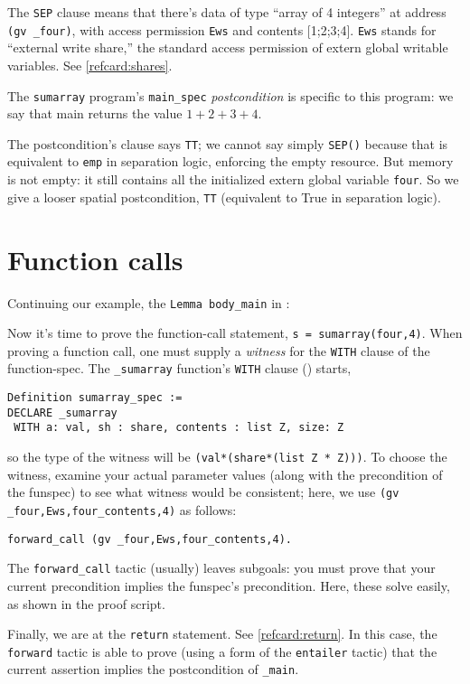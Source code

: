 \documentclass[12pt,fleqn,openany,oneside,showtrims]{memoir}
\begin{document}
The \lstinline{SEP} clause means that there's
data of type ``array of 4 integers'' at
address \lstinline{(gv _four)}, with access permission
\lstinline{Ews} and contents [1;2;3;4].
\lstinline{Ews} stands for ``external write share,''
the standard access permission of extern global writable
variables.  See \autoref{refcard:shares}.

The \lstinline{sumarray} program's \lstinline{main_spec}
\emph{postcondition} is specific to this program:
we say that main returns the value $1+2+3+4$.

The postcondition's \SEP{} clause says \lstinline{TT}; we cannot say simply
\lstinline{SEP()} because that is equivalent to
\lstinline{emp} in separation logic,
enforcing the empty resource.  But memory is not empty:
it still contains all the initialized extern global variable
\lstinline{four}.  So we give a looser spatial postcondition,
\lstinline{TT} (equivalent to True in separation logic).


\chapter{Function calls}
\label{refcard:forward-call}
Continuing our example, the \lstinline{Lemma body_main}
in :

Now it's time to prove the function-call statement,
\lstinline{s = sumarray(four,4)}.
When proving a function call, one must supply
a \emph{witness} for the \lstinline{WITH} clause
of the function-spec.  The \lstinline{_sumarray}
function's \lstinline{WITH} clause ()
starts,
\begin{lstlisting}
Definition sumarray_spec :=
DECLARE _sumarray
 WITH a: val, sh : share, contents : list Z, size: Z
\end{lstlisting}
so the type of the witness will be
\lstinline{(val*(share*(list Z * Z)))}.
To choose the witness, examine your actual parameter values
(along with the precondition of the funspec) to see
what witness would be consistent; here, we use
\lstinline{(gv _four,Ews,four_contents,4)} as follows:
\begin{lstlisting}
forward_call (gv _four,Ews,four_contents,4).
\end{lstlisting}
The \lstinline{forward_call} tactic (usually) leaves
subgoals: you must prove that your current
precondition implies the funspec's precondition.
Here, these solve easily, as shown in the proof script.

Finally, we are at the \lstinline{return} statement.
See \autoref{refcard:return}.
In this case, the \lstinline{forward} tactic is able to prove
(using a form of the \lstinline{entailer} tactic)
that the current assertion implies the
postcondition of \lstinline{_main}.
\end{document}
